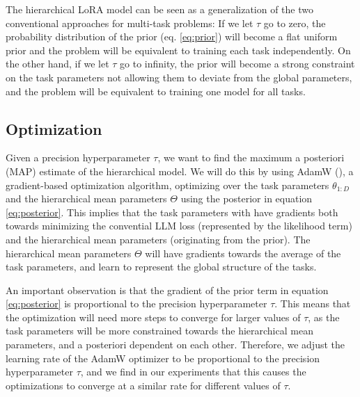 \documentclass{article}
\begin{document}
The hierarchical LoRA model can be seen as a generalization of the two conventional approaches for multi-task problems:
If we let $\tau$ go to zero, the probability distribution of the prior (eq. \ref{eq:prior}) will become a flat uniform prior and the problem will be equivalent to training each task independently. On the other hand, if we let $\tau$ go to infinity, the prior will become a strong constraint on the task parameters not allowing them to deviate from the global parameters, and the problem will be equivalent to training one model for all tasks.

\subsection{Optimization}
Given a precision hyperparameter $\tau$, we want to find the maximum a posteriori (MAP) estimate of the hierarchical model. 
We will do this by using AdamW (\cite{adamW}), a gradient-based optimization algorithm, optimizing over the task parameters $\theta_{1:D}$ and the hierarchical mean parameters $\Theta$ using the posterior in equation \ref{eq:posterior}.
This implies that the task parameters with have gradients both towards minimizing the convential LLM loss (represented by the likelihood term) and the hierarchical mean parameters (originating from the prior). The hierarchical mean parameters $\Theta$ will have gradients towards the average of the task parameters, and learn to represent the global structure of the tasks.

An important observation is that the gradient of the prior term in equation \ref{eq:posterior} is proportional to the precision hyperparameter $\tau$. This means that the optimization will need more steps to converge for larger values of $\tau$, as the task parameters will be more constrained towards the hierarchical mean parameters, and a posteriori dependent on each other.
Therefore, we adjust the learning rate of the AdamW optimizer to be proportional to the precision hyperparameter $\tau$, and we find in our experiments that this causes the optimizations to converge at a similar rate for different values of $\tau$.
\end{document}
